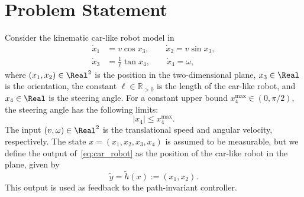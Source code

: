 \section{Problem Statement}\label{section:problem}
\label{sec:mathematical_model}
Consider the kinematic car-like robot model in~\cite{AkhNieWas2015} 
\begin{equation}
\begin{aligned}
\label{eq:car_robot}
    \dot{x}_{1} &= v\cos x_{3}, \quad\quad \dot{x}_{2} = v\sin x_{3}, \\ \dot{x}_{3} &= \frac{1}{\ell}\tan x_{4}, \quad\quad \dot{x}_{4} = \omega,
\end{aligned}
\end{equation}
where $(x_1,x_2)\in\Real^2$ is the position in the two-dimensional plane, $x_3\in\Real$ is the orientation, the constant $\ell\in\mathbb R_{>0}$ is the length of the car-like robot, and $x_4\in\Real$ is the steering angle. For a constant upper bound $x^{{\max}}_4 \in (0,\pi/2)$, the steering angle has the following limits:
\begin{equation}
 |x_4| \leq x^{{\max}}_4.
\label{eq:constraint}
\end{equation}
The input $(v,\omega) \in \Real^{2}$ is the translational speed and angular velocity, respectively. The state $x = (x_{1}, x_{2}, x_{3}, x_{4})$ is assumed to be measurable, but we define the output of~\eqref{eq:car_robot} as the position of the car-like robot in the plane, given by
%
%
\begin{equation}
  \tilde{y} =\tilde{h}(x):={\left(x_1, x_2\right)}.
\label{eq:output}
\end{equation}
This output is used as feedback to the path-invariant controller.

